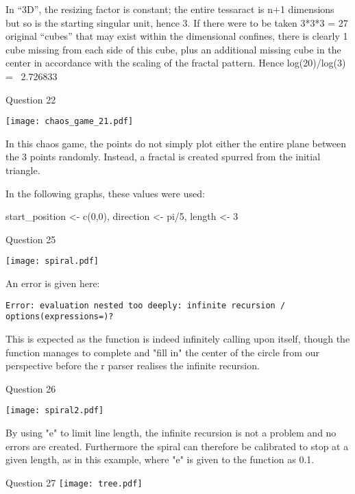 \documentclass[11pt, a4paper]{article}
\begin{document}
In “3D”, the resizing factor is constant; the entire tessaract is n+1 dimensions but so is the starting singular unit, hence  3. If there were to be taken 3*3*3 = 27 original “cubes” that may exist within the dimensional confines, there is clearly 1 cube missing from each side of this cube, plus an additional missing cube in the center in accordance with the scaling of the fractal pattern. Hence log(20)/log(3) =~ 2.726833 


Question 22

\texttt{[image: chaos\_game\_21.pdf]}

In this chaos game, the points do not simply plot either the entire plane between the 3 points randomly. Instead, a fractal is created spurred from the initial triangle.


\newpage

In the following graphs, these values were used: 
\vspace{1cm}

start_position <- c(0,0),  
direction <- pi/5,
length <- 3 

Question 25

\texttt{[image: spiral.pdf]}

An error is given here:

\begin{verbatim}
Error: evaluation nested too deeply: infinite recursion / options(expressions=)?
\end{verbatim}
\vspace{1cm}

This is expected as the function is indeed infinitely calling upon itself, though the function manages to complete and "fill in" the center of the circle from our perspective before the r parser realises the infinite recursion.


Question 26

\texttt{[image: spiral2.pdf]}

By using "e" to limit line length, the infinite recursion is not a problem and no errors are created. Furthermore the	spiral can therefore be calibrated to stop at a given length, as in this example, where "e" is given to the function as 0.1.

\newpage

Question 27 
\texttt{[image: tree.pdf]} 
\end{document}
